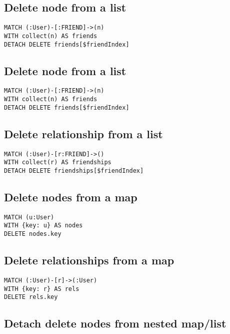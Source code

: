 \subsection{Delete node from a list}

\begin{lstlisting}
MATCH (:User)-[:FRIEND]->(n)
WITH collect(n) AS friends
DETACH DELETE friends[$friendIndex]
\end{lstlisting}

\subsection{Delete node from a list}

\begin{lstlisting}
MATCH (:User)-[:FRIEND]->(n)
WITH collect(n) AS friends
DETACH DELETE friends[$friendIndex]
\end{lstlisting}

\subsection{Delete relationship from a list}

\begin{lstlisting}
MATCH (:User)-[r:FRIEND]->()
WITH collect(r) AS friendships
DETACH DELETE friendships[$friendIndex]
\end{lstlisting}

\subsection{Delete nodes from a map}

\begin{lstlisting}
MATCH (u:User)
WITH {key: u} AS nodes
DELETE nodes.key
\end{lstlisting}

\subsection{Delete relationships from a map}

\begin{lstlisting}
MATCH (:User)-[r]->(:User)
WITH {key: r} AS rels
DELETE rels.key
\end{lstlisting}

\subsection{Detach delete nodes from nested map/list}


